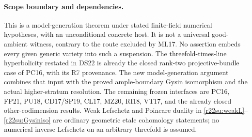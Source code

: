 \paragraph{Scope boundary and dependencies.}
This is a model-generation theorem under stated finite-field
numerical hypotheses, with an unconditional concrete host.
It is not a universal good-ambient witness, contrary to the
route excluded by ML17.  No assertion embeds every given
generic variety into such a suspension.  The threefold-times-line
hyperbolicity restated in DS22 is already the closed rank-two
projective-bundle case of PC16, with its R7 provenance.  The new
model-generation argument combines that input with the proved
ample-boundary Gysin isomorphism and the actual higher-stratum
resolution.  The remaining frozen interfaces are PC16, FP21,
PU18, CD17/SP19, CL17, MZ20,
RI18, VT17, and the already closed other-codimension results.
Weak Lefschetz and Poincare duality in
\eqref{r22su:weakL}--\eqref{r22su:Gysiniso} are ordinary
geometric etale cohomology statements; no numerical inverse
Lefschetz on an arbitrary threefold is assumed.
